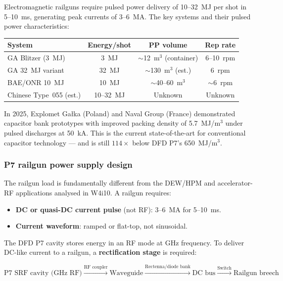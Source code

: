 \documentclass[11pt]{article}
\begin{document}
Electromagnetic railguns require pulsed power delivery of 10--32~MJ
per shot in 5--10~ms, generating peak currents of 3--6~MA. The key
systems and their pulsed power characteristics:

\begin{center}
\begin{tabular}{lccc}
\toprule
System & Energy/shot & PP volume & Rep rate \\
\midrule
GA Blitzer (3~MJ) & 3~MJ & $\sim$12~m$^3$ (container) & 6--10~rpm \\
GA 32~MJ variant & 32~MJ & $\sim$130~m$^3$ (est.) & 6~rpm \\
BAE/ONR 10~MJ & 10~MJ & $\sim$40--60~m$^3$ & $\sim$6~rpm \\
Chinese Type~055 (est.) & 10--32~MJ & Unknown & Unknown \\
\bottomrule
\end{tabular}
\end{center}

In 2025, Explomet Ga{\l}ka (Poland) and Naval Group (France) demonstrated
capacitor bank prototypes with improved packing density of 5.7~MJ/m$^3$
under pulsed discharges at 50~kA. This is the current state-of-the-art
for conventional capacitor technology --- and is still $114\times$ below
DFD P7's 650~MJ/m$^3$.

\subsubsection{P7 railgun power supply design}

The railgun load is fundamentally different from the DEW/HPM and
accelerator-RF applications analysed in W4i10. A railgun requires:
\begin{itemize}[nosep]
  \item \textbf{DC or quasi-DC current pulse} (not RF): 3--6~MA for 5--10~ms.
  \item \textbf{Current waveform}: ramped or flat-top, not sinusoidal.
\end{itemize}

The DFD P7 cavity stores energy in an RF mode at GHz frequency. To
deliver DC-like current to a railgun, a \textbf{rectification stage} is
required:

\begin{equation}
\text{P7 SRF cavity (GHz RF)} \xrightarrow{\text{RF coupler}}
\text{Waveguide} \xrightarrow{\text{Rectenna/diode bank}}
\text{DC bus} \xrightarrow{\text{Switch}} \text{Railgun breech}
\end{equation}
\end{document}

